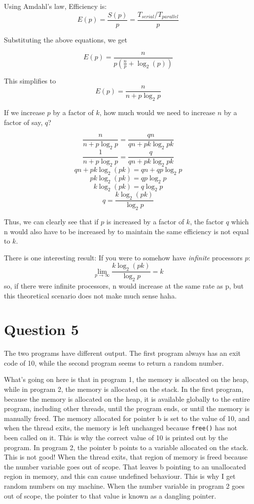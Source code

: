 \documentclass[letterpaper]{article}
\begin{document}
Using Amdahl's law, Efficiency is:
\begin{equation*}
E(p) = \frac{S(p)}{p} = \frac{T_{serial}/T_{parallel}}{p}
\end{equation*}

Substituting the above equations, we get

\[E(p) = \frac{n}{p (\frac{n}{p} + \log_2 (p)) } \]

This simplifies to
\[ E(p) = \frac{n}{n + p \log_2 p} \]

If we increase \(p\) by a factor of \(k\), how much would we need to increase \(n\) by a factor of say, \(q\)?

\[
 \frac{n}{n + p \log_2 p} = \frac{qn}{qn + pk \log_2 pk}
\]
\[
 \frac{1}{n + p \log_2 p} = \frac{q}{qn + pk \log_2 pk}
\]
\[
 qn + pk \log_2(pk) = qn + qp\log_2 p
\]
\[
 pk \log_2(pk) =  qp\log_2 p
\]
\[
 k \log_2(pk) =  q\log_2 p
\]
\[
 q = \frac{k \log_2(pk)}{\log_2 p}
\]


Thus, we can clearly see that if \(p\) is increased by a factor of \(k\),
the factor \(q\) which n would also have to be increased by to maintain the same efficiency is not equal to \(k\).


There is one interesting result: If you were to somehow have \emph{infinite} processors \(p\):
\[ \lim_{p \to \infty } \frac{k \log_2 (pk)}{\log_2 p} = k\]
so, if there were infinite processors, n would increase at the same rate as p, but this theoretical scenario does not make much sense haha.

\section{Question 5}
\label{sec:org7e2fe2a}
The two programs have different output. The first program always has an exit code of 10, while the second program seems
to return a random number.

What's going on here is that in program 1, the memory is allocated on the heap, while in program 2, the memory is allocated on the stack. In the first program, because the memory is allocated on the heap, it is available globally to the entire program, including other threads, until the program ends, or until the memory is manually freed. The memory allocated for pointer b is set to the value of 10, and when the thread exits, the memory is left unchanged because \texttt{free()} has not been called on it. This is why the correct value of 10 is printed out by the program. In program 2, the pointer b points to a variable allocated on the stack. This is not good! When the thread exits, that region of memory is freed because the number variable goes out of scope. That leaves b pointing to an unallocated region in memory, and this can cause undefined behaviour. This is why I get random numbers on my machine. When the number variable in program 2 goes out of scope, the pointer to that value is known as a dangling pointer.
\end{document}
